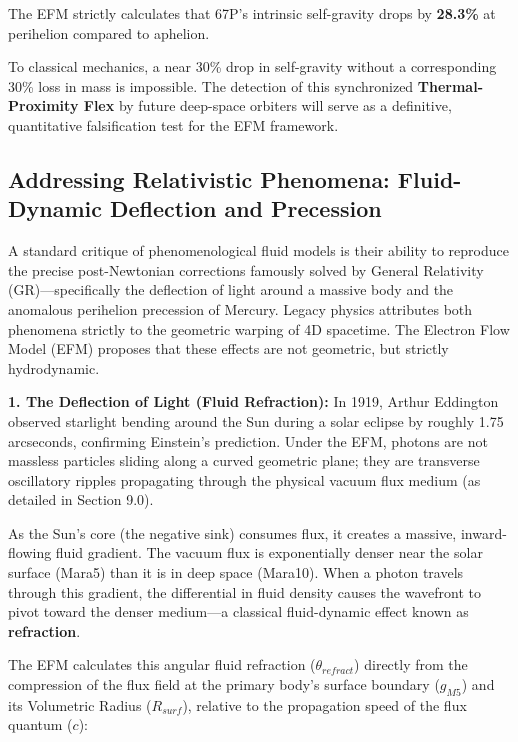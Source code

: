 \documentclass[11pt, a4paper]{article}
\begin{document}
  The EFM strictly calculates that 67P's intrinsic self-gravity drops by \textbf{28.3\%} at perihelion compared to aphelion. 

  To classical mechanics, a near 30\% drop in self-gravity without a corresponding 30\% loss in mass is impossible. The detection of this synchronized \textbf{Thermal-Proximity Flex} by future deep-space orbiters will serve as a definitive, quantitative falsification test for the EFM framework.

\subsection{Addressing Relativistic Phenomena: Fluid-Dynamic Deflection and Precession}

  A standard critique of phenomenological fluid models is their ability to reproduce the precise post-Newtonian corrections famously solved by General Relativity (GR)—specifically the deflection of light around a massive body and the anomalous perihelion precession of Mercury. Legacy physics attributes both phenomena strictly to the geometric warping of 4D spacetime. The Electron Flow Model (EFM) proposes that these effects are not geometric, but strictly hydrodynamic.

  \textbf{1. The Deflection of Light (Fluid Refraction):} 
  In 1919, Arthur Eddington observed starlight bending around the Sun during a solar eclipse by roughly 1.75 arcseconds, confirming Einstein's prediction. Under the EFM, photons are not massless particles sliding along a curved geometric plane; they are transverse oscillatory ripples propagating through the physical vacuum flux medium (as detailed in Section 9.0). 

  As the Sun's core (the negative sink) consumes flux, it creates a massive, inward-flowing fluid gradient. The vacuum flux is exponentially denser near the solar surface (Mara5) than it is in deep space (Mara10). When a photon travels through this gradient, the differential in fluid density causes the wavefront to pivot toward the denser medium—a classical fluid-dynamic effect known as \textbf{refraction}. 

  The EFM calculates this angular fluid refraction ($\theta_{refract}$) directly from the compression of the flux field at the primary body's surface boundary ($g_{M5}$) and its Volumetric Radius ($R_{surf}$), relative to the propagation speed of the flux quantum ($c$):
\end{document}
